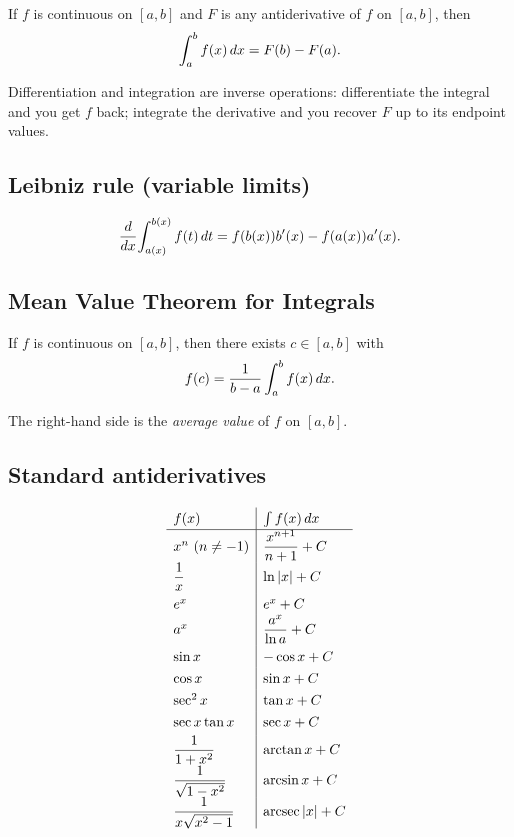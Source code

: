 \begin{theorem}
If $f$ is continuous on $[a,b]$ and $F$ is any antiderivative of $f$ on $[a,b]$, then
\[ \int_a^b f(x) \,dx = F(b) - F(a). \]
\end{theorem}

\begin{intuition}
Differentiation and integration are inverse operations: differentiate the integral and you get
$f$ back; integrate the derivative and you recover $F$ up to its endpoint values.
\end{intuition}

\subsection{Leibniz rule (variable limits)}
\[ \frac{d}{dx}\!\int_{a(x)}^{b(x)} f(t) \,dt = f(b(x)) b'(x) - f(a(x)) a'(x). \]

\subsection{Mean Value Theorem for Integrals}
\begin{theorem}
If $f$ is continuous on $[a,b]$, then there exists $c \in [a,b]$ with
\[ f(c) = \frac{1}{b-a} \int_a^b f(x) \,dx. \]
\end{theorem}
The right-hand side is the \emph{average value} of $f$ on $[a,b]$.

\subsection{Standard antiderivatives}
\begin{keybox}
\[
\renewcommand{\arraystretch}{1.3}
\begin{array}{l|l}
f(x) & \int f(x) \dx \\\hline
x^n\ (n \neq -1) & \dfrac{x^{n+1}}{n+1} + C \\[4pt]
\dfrac{1}{x} & \ln|x| + C \\[4pt]
e^x & e^x + C \\
a^x & \dfrac{a^x}{\ln a} + C \\[4pt]
\sin x & -\cos x + C \\
\cos x & \sin x + C \\
\sec^2 x & \tan x + C \\
\sec x \tan x & \sec x + C \\[2pt]
\dfrac{1}{1+x^2} & \arctan x + C \\[4pt]
\dfrac{1}{\sqrt{1-x^2}} & \arcsin x + C \\[4pt]
\dfrac{1}{x\sqrt{x^2-1}} & \arcsec|x| + C
\end{array}
\]
\end{keybox}
